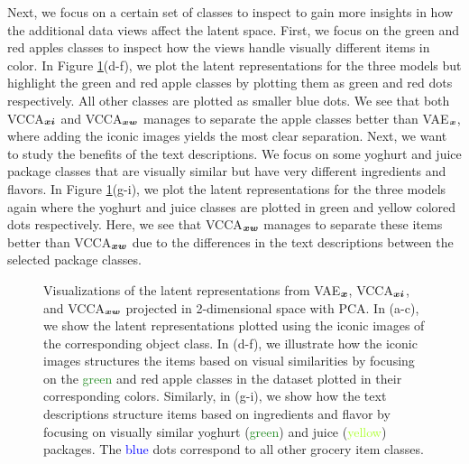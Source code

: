 Next, we focus on a certain set of classes to inspect to gain more insights in how the additional data views affect the latent space. First, we focus on the green and red apples classes to inspect how the views handle visually different items in color. In Figure \ref{fig:latent_space_visualizations}(d-f), we plot the latent representations for the three models but highlight the green and red apple classes by plotting them as green and red dots respectively. All other classes are plotted as smaller blue dots. We see that both VCCA$_{{\bm{x}} {\bm{i}}}$ and VCCA$_{{\bm{x}} {\bm{w}}}$ manages to separate the apple classes better than VAE$_{{\bm{x}}}$, where adding the iconic images yields the most clear separation. Next, we want to study the benefits of the text descriptions. We focus on some yoghurt and juice package classes that are visually similar but have very different ingredients and flavors. In Figure \ref{fig:latent_space_visualizations}(g-i), we plot the latent representations for the three models again where the yoghurt and juice classes are plotted in green and yellow colored dots respectively. Here, we see that VCCA$_{{\bm{x}} {\bm{w}}}$ manages to separate these items better than VCCA$_{{\bm{x}} {\bm{w}}}$ due to the differences in the text descriptions between the selected package classes. 

\begin{figure}[t]
	\centering
	
	\vspace{-2mm}
	\caption{ Visualizations of the latent representations from VAE$_{\bm{x}}$, VCCA$_{{\bm{x}}{\bm{i}}}$, and VCCA$_{{\bm{x}}{\bm{w}}}$ projected in 2-dimensional space with PCA. In (a-c), we show the latent representations plotted using the iconic images of the corresponding object class. In (d-f), we illustrate how the iconic images structures the items based on visual similarities by focusing on the \textcolor{ForestGreen}{green} and \textcolor{RedOrange}{red} apple classes in the dataset plotted in their corresponding colors. Similarly, in (g-i), we show how the text descriptions structure items based on ingredients and flavor by focusing on visually similar yoghurt (\textcolor{ForestGreen}{green}) and juice (\textcolor{GreenYellow}{yellow}) packages. The \textcolor{blue}{blue} dots correspond to all other grocery item classes. } 
	\label{fig:latent_space_visualizations}
	\vspace{-3mm}
\end{figure}




